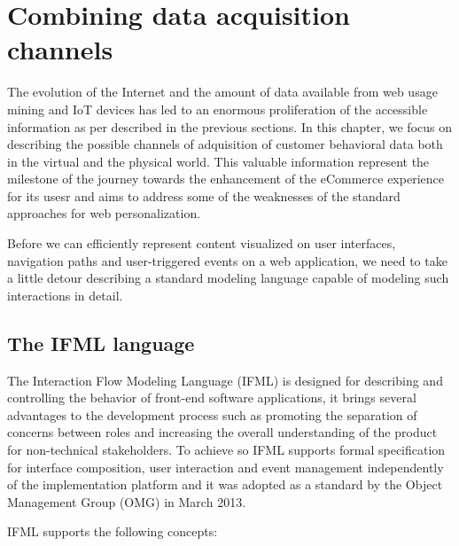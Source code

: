 \chead{}
\chapter{Combining data acquisition channels}

The evolution of the Internet and the amount of data available from web usage mining and IoT devices has led to an enormous proliferation of the accessible information as per described in the previous sections.  In this chapter, we focus on describing the possible channels of adquisition of customer behavioral data both in the virtual and the physical world. This valuable information represent the milestone of the journey towards the enhancement of the eCommerce experience for its usesr and aims to address some of the weaknesses of the standard approaches for web personalization.

Before we can efficiently represent content visualized on user interfaces, navigation paths and user-triggered events on a web application, we need to take a little detour describing a standard modeling language capable of modeling such interactions in detail.

\section{The IFML language}

The Interaction Flow Modeling Language (IFML)\cite{IFML-1, IFML-2} is designed for describing and controlling the behavior of front-end software applications, it brings several advantages to the development process such as promoting the separation of concerns between roles and increasing the overall understanding of the product for non-technical stakeholders. To achieve so IFML supports formal specification for interface composition, user interaction and event management independently of the implementation platform and it was adopted as a standard by the Object Management Group (OMG) in March 2013.

IFML supports the following concepts: 

